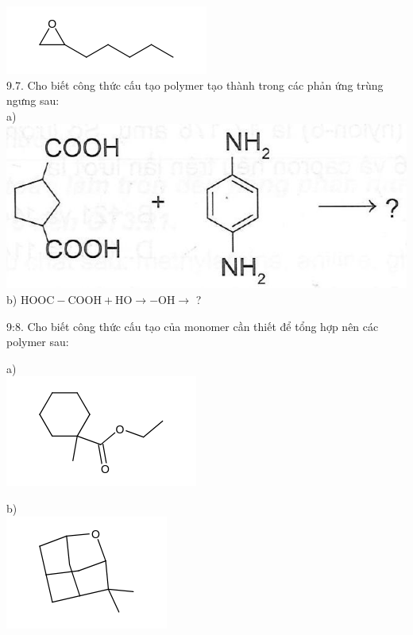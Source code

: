\documentclass[10pt]{article}
\begin{document}
\includegraphics{smile-a9230b17f562351ea203d633322dc15693fc0354}\\
9.7. Cho biết công thức cấu tạo polymer tạo thành trong các phản ứng trùng ngưng sau:\\
a)\\
\includegraphics[max width=\textwidth, center]{2025_10_23_de6f5713836e4e91b3c8g-066(1)}\\
b) $\mathrm{HOOC}-\mathrm{COOH}+\mathrm{HO} \longrightarrow-\mathrm{OH} \longrightarrow$ ?

9:8. Cho biết công thức cấu tạo của monomer cần thiết để tổng hợp nên các polymer sau:

a)\\
\includegraphics{smile-5744ac23e5689f218f5258fe686de42e94945a87}

b)\\
\includegraphics{smile-1a4b482ed64a2494574d03d8fe96d1bbb5b9d027}
\end{document}
